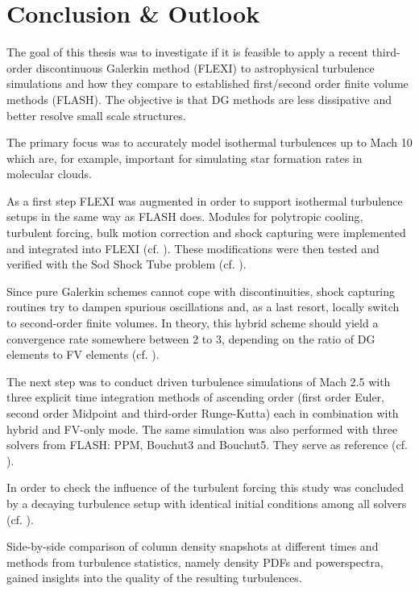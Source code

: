 \section{Conclusion \& Outlook}
The goal of this thesis was to investigate if it is feasible to apply a
recent third-order discontinuous Galerkin method (FLEXI) to astrophysical
turbulence simulations and how they compare to established first/second order
finite volume methods (FLASH). The objective is that DG methods are less
dissipative and better resolve small scale structures.

The primary focus was to accurately model isothermal turbulences up to Mach 10
which are, for example, important for simulating star formation rates in
molecular clouds.

As a first step FLEXI was augmented in order to support isothermal turbulence
setups in the same way as FLASH does. Modules for polytropic cooling, turbulent
forcing, bulk motion correction and shock capturing were implemented and
integrated into FLEXI (cf. ). These
modifications were then tested and verified with the Sod Shock Tube problem
(cf. ).

Since pure Galerkin schemes cannot cope with discontinuities, shock
capturing routines try to dampen spurious oscillations and, as a last resort,
locally switch to second-order finite volumes. In theory, this hybrid scheme
should yield a convergence rate somewhere between 2 to 3, depending on the
ratio of DG elements to FV elements (cf. ).

The next step was to conduct driven turbulence simulations of Mach 2.5 with
three explicit time integration methods of ascending order (first order Euler,
second order Midpoint and third-order Runge-Kutta) each in combination with
hybrid and FV-only mode. The same simulation was also performed with three
solvers from FLASH: PPM, Bouchut3 and Bouchut5. They serve as reference
(cf. ).

In order to check the influence of the turbulent forcing this study was
concluded by a decaying turbulence setup with identical initial conditions
among all solvers (cf. ).

Side-by-side comparison of column density snapshots at different times and
methods from turbulence statistics, namely density PDFs and powerspectra,
gained insights into the quality of the resulting turbulences.

